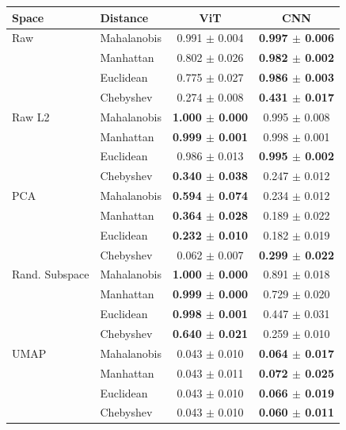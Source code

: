 \begin{tabular}{llcc}
\toprule
Space & Distance & ViT & CNN \\
\midrule
Raw & Mahalanobis & 0.991 $\pm$ 0.004 & \textbf{0.997 $\pm$ 0.006} \\
 & Manhattan & 0.802 $\pm$ 0.026 & \textbf{0.982 $\pm$ 0.002} \\
 & Euclidean & 0.775 $\pm$ 0.027 & \textbf{0.986 $\pm$ 0.003} \\
 & Chebyshev & 0.274 $\pm$ 0.008 & \textbf{0.431 $\pm$ 0.017} \\
\midrule
Raw L2 & Mahalanobis & \textbf{1.000 $\pm$ 0.000} & 0.995 $\pm$ 0.008 \\
 & Manhattan & \textbf{0.999 $\pm$ 0.001} & 0.998 $\pm$ 0.001 \\
 & Euclidean & 0.986 $\pm$ 0.013 & \textbf{0.995 $\pm$ 0.002} \\
 & Chebyshev & \textbf{0.340 $\pm$ 0.038} & 0.247 $\pm$ 0.012 \\
\midrule
PCA & Mahalanobis & \textbf{0.594 $\pm$ 0.074} & 0.234 $\pm$ 0.012 \\
 & Manhattan & \textbf{0.364 $\pm$ 0.028} & 0.189 $\pm$ 0.022 \\
 & Euclidean & \textbf{0.232 $\pm$ 0.010} & 0.182 $\pm$ 0.019 \\
 & Chebyshev & 0.062 $\pm$ 0.007 & \textbf{0.299 $\pm$ 0.022} \\
\midrule
Rand. Subspace & Mahalanobis & \textbf{1.000 $\pm$ 0.000} & 0.891 $\pm$ 0.018 \\
 & Manhattan & \textbf{0.999 $\pm$ 0.000} & 0.729 $\pm$ 0.020 \\
 & Euclidean & \textbf{0.998 $\pm$ 0.001} & 0.447 $\pm$ 0.031 \\
 & Chebyshev & \textbf{0.640 $\pm$ 0.021} & 0.259 $\pm$ 0.010 \\
\midrule
UMAP & Mahalanobis & 0.043 $\pm$ 0.010 & \textbf{0.064 $\pm$ 0.017} \\
 & Manhattan & 0.043 $\pm$ 0.011 & \textbf{0.072 $\pm$ 0.025} \\
 & Euclidean & 0.043 $\pm$ 0.010 & \textbf{0.066 $\pm$ 0.019} \\
 & Chebyshev & 0.043 $\pm$ 0.010 & \textbf{0.060 $\pm$ 0.011} \\

\bottomrule
\end{tabular}